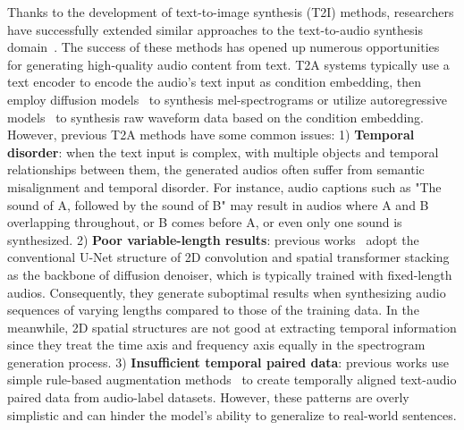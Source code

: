 \documentclass{article}
\begin{document}
Thanks to the development of text-to-image synthesis (T2I) methods, researchers have successfully extended similar approaches to the text-to-audio synthesis domain~\cite{huang2023makeanaudio,liuAudioLDMTexttoAudioGeneration2023,yangDiffsoundDiscreteDiffusion2023,kreukAudioGenTextuallyGuided2023}. The success of these methods has opened up numerous opportunities for generating high-quality audio content from text.
T2A systems typically use a text encoder to encode the audio's text input as condition embedding, then employ diffusion models~\cite{huang2023makeanaudio,liuAudioLDMTexttoAudioGeneration2023,yangDiffsoundDiscreteDiffusion2023} to synthesis mel-spectrograms or utilize autoregressive models~\cite{kreukAudioGenTextuallyGuided2023} to synthesis raw waveform data based on the condition embedding. However, previous T2A methods have some common issues: 1) \textbf{Temporal disorder}: when the text input is complex, with multiple objects and temporal relationships between them, the generated audios often suffer from semantic misalignment and temporal disorder. For instance, audio captions such as "The sound of A, followed by the sound of B" may result in audios where A and B overlapping throughout, or B comes before A, or even only one sound is synthesized. 2) \textbf{Poor variable-length results}: previous works~\cite{huang2023makeanaudio} adopt the conventional U-Net structure of 2D convolution and spatial transformer stacking as the backbone of diffusion denoiser, which is typically trained with fixed-length audios. Consequently, they generate suboptimal results when synthesizing audio sequences of varying lengths compared to those of the training data. In the meanwhile, 2D spatial structures are not good at extracting temporal information since they treat the time axis and frequency axis equally in the spectrogram generation process. 3) \textbf{Insufficient temporal paired data}: previous works use simple rule-based augmentation methods~\cite{elizalde2022clap,kreukAudioGenTextuallyGuided2023} to create temporally aligned text-audio paired data from audio-label datasets. However, these patterns are overly simplistic and can hinder the model's ability to generalize to real-world sentences.
\end{document}
